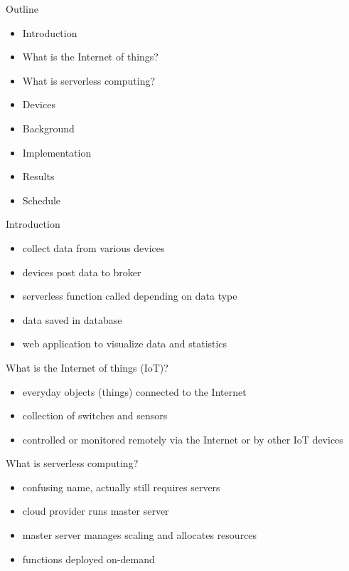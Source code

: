 \documentclass[aspectratio=169]{beamer}
\begin{document}
  \maketitle

  \begin{frame}{Outline}
    \begin{itemize}
      \item Introduction
      \item What is the Internet of things?
      \item What is serverless computing?
      \item Devices
      \item Background
      \item Implementation
      \item Results
      \item Schedule
    \end{itemize}
  \end{frame}

  \begin{frame}{Introduction}
    \begin{itemize}
      \item collect data from various devices
      \item devices post data to broker
      \item serverless function called depending on data type
      \item data saved in database
      \item web application to visualize data and statistics
    \end{itemize}
  \end{frame}

  \begin{frame}{What is the Internet of things (IoT)?}
    \begin{itemize}
      \item everyday objects (things) connected to the Internet
      \item collection of switches and sensors
      \item controlled or monitored remotely via the Internet or by other IoT devices
    \end{itemize}
  \end{frame}

  \begin{frame}{What is serverless computing?}
    \begin{itemize}
      \item confusing name, actually still requires servers
      \item cloud provider runs master server
      \item master server manages scaling and allocates resources
      \item functions deployed on-demand
    \end{itemize}
  \end{frame}
\end{document}
